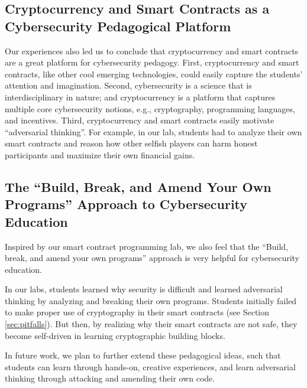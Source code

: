 \documentclass[10pt,twocolumn,letterpaper]{article}
\newcommand{\ignore}[1]{}
\begin{document}
\subsection{Cryptocurrency and Smart Contracts as 
a Cybersecurity Pedagogical Platform}
Our experiences also led us to conclude 
that cryptocurrency and smart contracts are a
great platform for cybersecurity pedagogy. 
First, cryptocurrency and smart contracts, like
other cool emerging technologies, could easily capture the students'
attention and imagination.
Second, 
cybersecurity is a science that is interdisciplinary in nature;
and cryptocurrency is a platform that captures 
multiple core cybersecurity notions, e.g., cryptography, 
programming languages, and incentives. 
Third, cryptocurrency and smart contracts
easily motivate ``adversarial thinking''. For example,
in our lab, students had to analyze their own smart contracts
and reason how other selfish players can harm 
honest participants and maximize their own financial gains.

\ignore{
in our lab, students were able to compose smart contracts,
and then conduct in-depth security analyses of their own smart contracts.
In this process, students learned the 
essence of ``adversarial thinking'', e.g., by reasoning how
selfish participants in a smart contract 
can maximize its financial gains and harm honest players. 
}


\subsection{The ``Build, Break, and Amend Your Own Programs''
Approach to Cybersecurity Education}
Inspired by our smart contract programming lab, 
we also feel that the 
``Build, break, and amend your own programs'' approach
is very helpful for cybersecurity education. 

In our labs, students learned why security is difficult 
and learned adversarial thinking
by analyzing and breaking 
their own programs.  
Students initially  
failed to make proper use of cryptography in their 
smart contracts (see Section \ref{sec:pitfalls}).
But then, by realizing
why their smart contracts are not safe, they 
become self-driven in learning cryptographic building blocks.

In future work, we plan to further extend these pedagogical ideas, 
such that students can learn through hands-on, 
creative experiences, and learn adversarial thinking 
through attacking and amending their own code.
\end{document}

